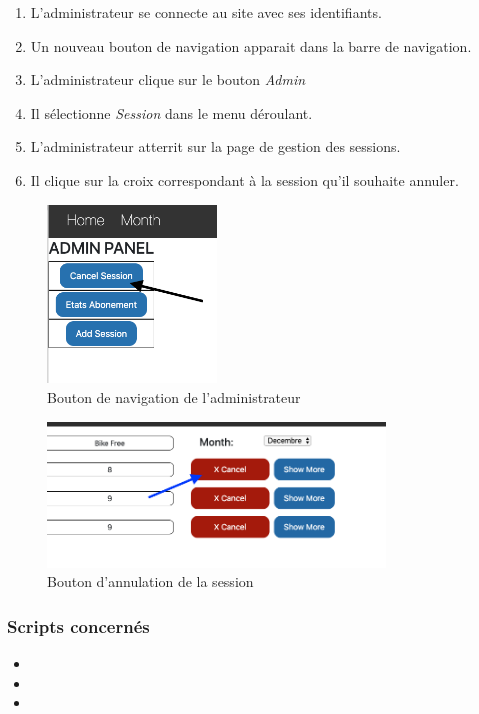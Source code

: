 \begin{enumerate}
	\item L'administrateur se connecte au site avec ses identifiants. 
	\item Un nouveau bouton de navigation apparait dans la barre de navigation. 
	\item L'administrateur clique sur le bouton \textit{Admin}
	\item Il sélectionne \textit{Session} dans le menu déroulant. 
	\item L'administrateur atterrit sur la page de gestion des sessions. 
	\item Il clique sur la croix correspondant à la session qu'il souhaite annuler. 
\end{enumerate}

\newpage
\begin{figure}[h]
	\includegraphics[width=0.4\textwidth,center]{Figures/us9-1}
	\caption{Bouton de navigation de l'administrateur}
\end{figure}

\vspace{\baselineskip}
\begin{figure}[h]
	\includegraphics[width=0.8\textwidth,center]{Figures/us9-2}
	\caption{Bouton d'annulation de la session}
\end{figure}


\vspace{\baselineskip}
\subsubsection{Scripts concernés}
	\begin{itemize}
		\item {}
		\item {}
		\item {}
	\end{itemize}
